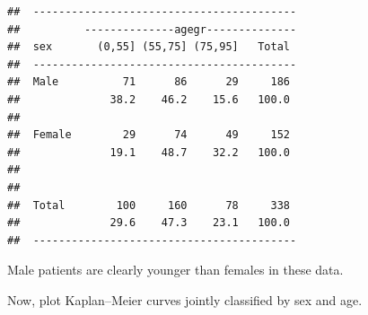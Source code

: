 \documentclass[
]{book}
\newenvironment{Shaded}{\begin{snugshade}}{\end{snugshade}}
\newcommand{\AttributeTok}[1]{\textcolor[rgb]{0.13,0.29,0.53}{#1}}
\newcommand{\ConstantTok}[1]{\textcolor[rgb]{0.56,0.35,0.01}{#1}}
\newcommand{\DecValTok}[1]{\textcolor[rgb]{0.00,0.00,0.81}{#1}}
\newcommand{\FunctionTok}[1]{\textcolor[rgb]{0.13,0.29,0.53}{\textbf{#1}}}
\newcommand{\NormalTok}[1]{#1}
\newcommand{\OtherTok}[1]{\textcolor[rgb]{0.56,0.35,0.01}{#1}}
\newcommand{\SpecialCharTok}[1]{\textcolor[rgb]{0.81,0.36,0.00}{\textbf{#1}}}
\theoremstyle{definition}
\theoremstyle{definition}
\theoremstyle{definition}
\theoremstyle{definition}
\theoremstyle{remark}
\begin{document}
\begin{Shaded}
\end{Shaded}

\begin{verbatim}
##  ----------------------------------------- 
##          --------------agegr-------------- 
##  sex       (0,55] (55,75] (75,95]   Total  
##  ----------------------------------------- 
##  Male          71      86      29     186  
##              38.2    46.2    15.6   100.0  
##                                            
##  Female        29      74      49     152  
##              19.1    48.7    32.2   100.0  
##                                            
##                                            
##  Total        100     160      78     338  
##              29.6    47.3    23.1   100.0  
##  -----------------------------------------
\end{verbatim}

Male patients are clearly younger than females in these data.

Now, plot Kaplan--Meier curves jointly classified by sex and age.
\end{document}
